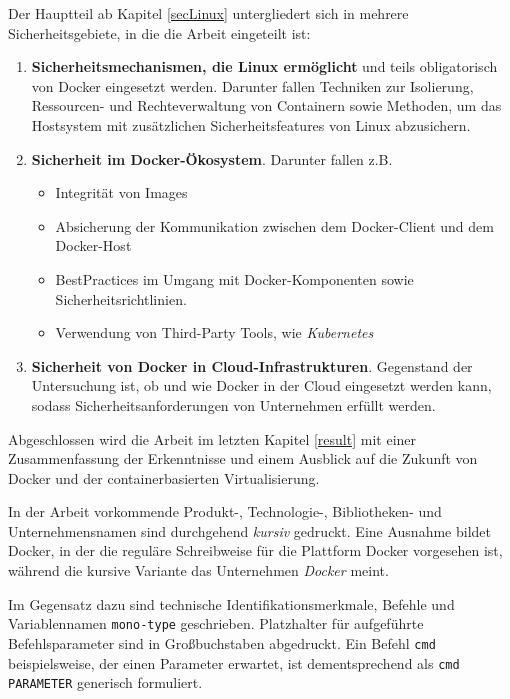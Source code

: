 \documentclass[../main.tex]{subfiles}
\begin{document}
    Der Hauptteil ab Kapitel \ref{secLinux} untergliedert sich in mehrere Sicherheitsgebiete, in die die Arbeit eingeteilt ist:
    \begin{enumerate}
      \item \textbf{Sicherheitsmechanismen, die Linux ermöglicht} und teils obligatorisch von Docker eingesetzt werden. Darunter fallen Techniken zur Isolierung, Ressourcen- und Rechteverwaltung von Containern sowie Methoden, um das Hostsystem mit zusätzlichen Sicherheitsfeatures von Linux abzusichern.
      \item \textbf{Sicherheit im Docker-Ökosystem}. Darunter fallen z.B.
        \begin{itemize}
          \item Integrität von Images
          \item Absicherung der Kommunikation zwischen dem Docker-Client und dem Docker-Host
          \item \glspl{BestPractice} im Umgang mit Docker-Komponenten sowie Sicherheitsrichtlinien.
          \item Verwendung von Third-Party Tools, wie \emph{Kubernetes} %
        \end{itemize}
      \item \textbf{Sicherheit von Docker in Cloud-Infrastrukturen}. Gegenstand der Untersuchung ist, ob und wie Docker in der Cloud eingesetzt werden kann, sodass Sicherheitsanforderungen von Unternehmen erfüllt werden.
    \end{enumerate}

    Abgeschlossen wird die Arbeit im letzten Kapitel \ref{result} mit einer Zusammenfassung der Erkenntnisse und einem Ausblick auf die Zukunft von Docker und der containerbasierten Virtualisierung.

    In der Arbeit vorkommende Produkt-, Technologie-, Bibliotheken- und Unternehmensnamen sind durchgehend \emph{kursiv} gedruckt. Eine Ausnahme bildet Docker, in der die reguläre Schreibweise für die Plattform Docker vorgesehen ist, während die kursive Variante das Unternehmen \emph{Docker} meint.

    Im Gegensatz dazu sind technische Identifikationsmerkmale, Befehle und Variablennamen \texttt{mono-type} geschrieben. Platzhalter für aufgeführte Befehlsparameter sind in Großbuchstaben abgedruckt. Ein Befehl \texttt{cmd} beispielsweise, der einen Parameter erwartet, ist dementsprechend als \texttt{cmd PARAMETER} generisch formuliert.
\end{document}
